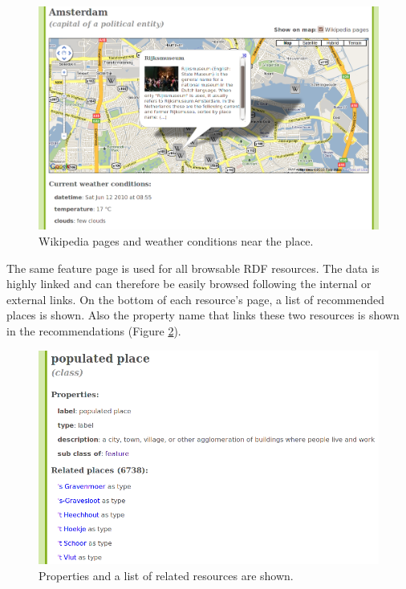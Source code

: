 \documentclass[a4paper,12pt]{article}
\begin{document}
\begin{figure}[h]
  \includegraphics[width=\linewidth]{img/feature.png}
  \caption{Wikipedia pages and weather conditions near the place.}
  \label{feature}
\end{figure}

The same feature page is used for all browsable RDF resources. The
data is highly linked and can therefore be easily browsed following
the internal or external links. On the bottom of each resource's page,
a list of recommended places is shown. Also the property name that
links these two resources is shown in the recommendations (Figure
\ref{recommendations}).

\begin{figure}[h]
  \includegraphics[width=\linewidth]{img/recommendations.png}
  \caption{Properties and a list of related resources are shown.}
  \label{recommendations}
\end{figure}
\end{document}
